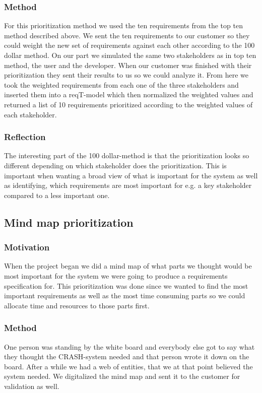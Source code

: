 \documentclass[10pt]{article}
\begin{document}
\subsubsection{Method}
For this prioritization method we used the ten requirements from the top ten method described above. We sent the ten requirements to our customer so they could weight the new set of requirements against each other according to the 100 dollar method. On our part we simulated the same two stakeholders as in top ten method, the user and the developer. When our customer was finished with their prioritization they sent their results to us so we could analyze it.
From here we took the weighted requirements from each one of the three stakeholders and inserted them into a reqT-model which then normalized the weighted values and returned a list of 10 requirements prioritized according to the weighted values of each stakeholder.
\subsubsection{Reflection}
The interesting part of the 100 dollar-method is that the prioritization looks so different depending on which stakeholder does the prioritization. This is important when wanting a broad view of what is important for the system as well as identifying, which requirements are most important for e.g. a key stakeholder compared to a less important one.

\subsection{Mind map prioritization}
\subsubsection{Motivation}
When the project began we did a mind map of what parts we thought would be most important for the system we were going to produce a requirements specification for. This prioritization was done since we wanted to find the most important requirements as well as the most time consuming parts so we could allocate time and resources to those parts first.
\subsubsection{Method}
One person was standing by the white board and everybody else got to say what they thought the CRASH-system needed and that person wrote it down on the board. After a while we had a web of entities, that we at that point believed the system needed. We digitalized the mind map and sent it to the customer for validation as well.
\end{document}

